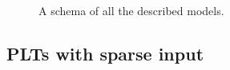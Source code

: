 \documentclass{article}
\newcommand{\Algo}[1]{\textsc{#1}}
\renewcommand{\vec}[1]{\boldsymbol{#1}}
\newcommand{\bx}{\vec{x}}
\newcommand{\by}{\vec{y}}
\newcommand{\heta}{\hat{\eta}}
\newcommand{\Path}[1]{\mathrm{Path}(#1)}
\newcommand{\sectionBefore}{-0pt}
\newcommand{\sectionAfter}{-0pt}
\begin{document}
\begin{figure}
	\begin{center}
		
	\end{center}
	\caption{A schema of all the described models.}
	\label{pic:module-repres-module-tag}
\end{figure}


%
%
%	
%

\vspace{\sectionBefore}
\subsection{PLTs with sparse input}
\label{sec:sparse_input}
\vspace{\sectionAfter}
\end{document}

